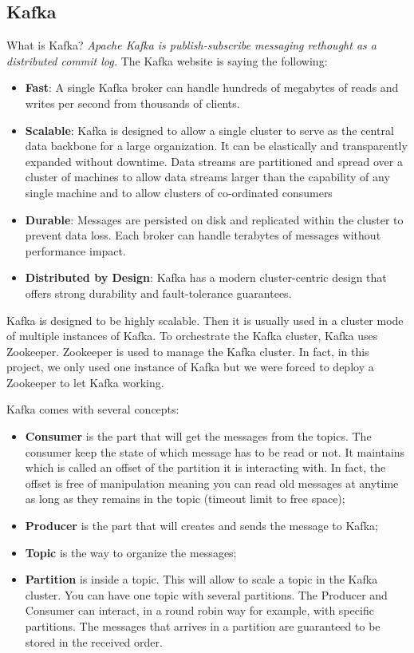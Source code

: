 \subsection{Kafka}

What is Kafka? \emph{Apache Kafka is publish-subscribe messaging rethought as a distributed commit log.} The Kafka website is saying the following:

\begin{itemize}
\item\textbf{Fast}: A single Kafka broker can handle hundreds of megabytes of reads and writes per second from thousands of clients.
\item\textbf{Scalable}: Kafka is designed to allow a single cluster to serve as the central data backbone for a large organization. It can be elastically and transparently expanded without downtime. Data streams are partitioned and spread over a cluster of machines to allow data streams larger than the capability of any single machine and to allow clusters of co-ordinated consumers
\item\textbf{Durable}: Messages are persisted on disk and replicated within the cluster to prevent data loss. Each broker can handle terabytes of messages without performance impact.
\item\textbf{Distributed by Design}: Kafka has a modern cluster-centric design that offers strong durability and fault-tolerance guarantees. 
\end{itemize}

Kafka is designed to be highly scalable. Then it is usually used in a cluster mode of multiple instances of Kafka. To orchestrate the Kafka cluster, Kafka uses Zookeeper. Zookeeper is used to manage the Kafka cluster. In fact, in this project, we only used one instance of Kafka but we were forced to deploy a Zookeeper to let Kafka working.

Kafka comes with several concepts:

\begin{itemize}
\item\textbf{Consumer} is the part that will get the messages from the topics. The consumer keep the state of which message has to be read or not. It maintains which is called an offset of the partition it is interacting with. In fact, the offset is free of manipulation meaning you can read old messages at anytime as long as they remains in the topic (timeout limit to free space);
\item\textbf{Producer} is the part that will creates and sends the message to Kafka;
\item\textbf{Topic} is the way to organize the messages;
\item\textbf{Partition} is inside a topic. This will allow to scale a topic in the Kafka cluster. You can have one topic with several partitions. The Producer and Consumer can interact, in a round robin way for example, with specific partitions. The messages that arrives in a partition are guaranteed to be stored in the received order.
\end{itemize}

